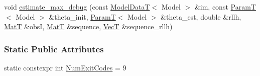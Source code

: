 \begin{DoxyCompactItemize}
\item 
void \hyperlink{classmappel_1_1Estimator_a4a581372a320f1c13eeffacf6309911b}{estimate\+\_\+max\+\_\+debug} (const \hyperlink{namespacemappel_a97f050df953605381ae9c901c3b125f1}{Model\+DataT}$<$ Model $>$ \&im, const \hyperlink{namespacemappel_a667925cb0d6c0e49f2f035cc5a9a6857}{ParamT}$<$ Model $>$ \&theta\+\_\+init, \hyperlink{namespacemappel_a667925cb0d6c0e49f2f035cc5a9a6857}{ParamT}$<$ Model $>$ \&theta\+\_\+est, double \&rllh, \hyperlink{namespacemappel_a7091ab87c528041f7e2027195fad8915}{MatT} \&obsI, \hyperlink{namespacemappel_a7091ab87c528041f7e2027195fad8915}{MatT} \&sequence, \hyperlink{namespacemappel_a2225ad69f358daa3f4f99282a35b9a3a}{VecT} \&sequence\+\_\+rllh)
\end{DoxyCompactItemize}
\subsubsection*{Static Public Attributes}
\begin{DoxyCompactItemize}
\item 
static constexpr int \hyperlink{classmappel_1_1Estimator_afcec036c4d78c12d427e0a733a00a48e}{Num\+Exit\+Codes} = 9
\end{DoxyCompactItemize}
